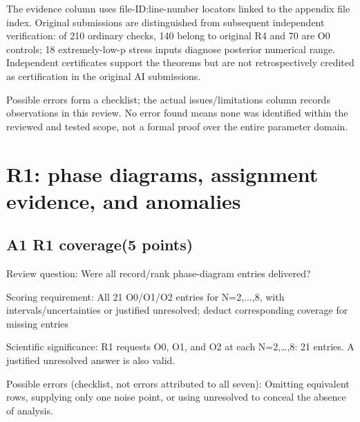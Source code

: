 \documentclass[11pt,a4paper]{article}
\begin{document}
The evidence column uses file-ID:line-number locators linked to the appendix file index. Original submissions are distinguished from subsequent independent verification: of 210 ordinary checks,\allowbreak{} 140 belong to original R4 and 70 are O0 controls; 18 extremely-low-p stress inputs diagnose posterior numerical range. Independent certificates support the theorems but are not retrospectively credited as certification in the original AI submissions.

Possible errors form a checklist; the actual issues/\allowbreak{}limitations column records observations in this review. No error found means none was identified within the reviewed and tested scope,\allowbreak{} not a formal proof over the entire parameter domain.

\clearpage
\section{R1: phase diagrams,\allowbreak{} assignment evidence,\allowbreak{} and anomalies}
\subsection{A1 R1 coverage(5 points)}
\label{aspect:A1}
Review question: Were all record/\allowbreak{}rank phase-diagram entries delivered?

Scoring requirement: All 21 O0/\allowbreak{}O1/\allowbreak{}O2 entries for N=2,\allowbreak{}...,\allowbreak{}8,\allowbreak{} with intervals/\allowbreak{}uncertainties or justified unresolved; deduct corresponding coverage for missing entries

Scientific significance: R1 requests O0,\allowbreak{} O1,\allowbreak{} and O2 at each N=2,\allowbreak{}…,\allowbreak{}8: 21 entries. A justified unresolved answer is also valid.

Possible errors (checklist,\allowbreak{} not errors attributed to all seven): Omitting equivalent rows,\allowbreak{} supplying only one noise point,\allowbreak{} or using unresolved to conceal the absence of analysis.
\end{document}
